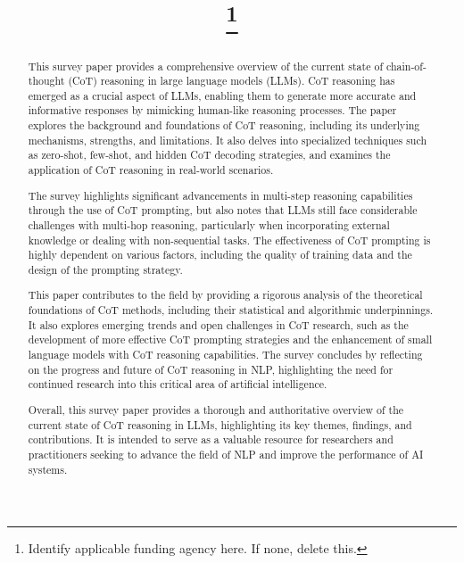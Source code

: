 \documentclass[conference]{IEEEtran}
\begin{document}
\title{
\thanks{Identify applicable funding agency here. If none, delete this.}
}

\author{
\and
{}
}

\maketitle

\begin{abstract}
This survey paper provides a comprehensive overview of the current state of chain-of-thought (CoT) reasoning in large language models (LLMs). CoT reasoning has emerged as a crucial aspect of LLMs, enabling them to generate more accurate and informative responses by mimicking human-like reasoning processes. The paper explores the background and foundations of CoT reasoning, including its underlying mechanisms, strengths, and limitations. It also delves into specialized techniques such as zero-shot, few-shot, and hidden CoT decoding strategies, and examines the application of CoT reasoning in real-world scenarios.

The survey highlights significant advancements in multi-step reasoning capabilities through the use of CoT prompting, but also notes that LLMs still face considerable challenges with multi-hop reasoning, particularly when incorporating external knowledge or dealing with non-sequential tasks. The effectiveness of CoT prompting is highly dependent on various factors, including the quality of training data and the design of the prompting strategy.

This paper contributes to the field by providing a rigorous analysis of the theoretical foundations of CoT methods, including their statistical and algorithmic underpinnings. It also explores emerging trends and open challenges in CoT research, such as the development of more effective CoT prompting strategies and the enhancement of small language models with CoT reasoning capabilities. The survey concludes by reflecting on the progress and future of CoT reasoning in NLP, highlighting the need for continued research into this critical area of artificial intelligence.

Overall, this survey paper provides a thorough and authoritative overview of the current state of CoT reasoning in LLMs, highlighting its key themes, findings, and contributions. It is intended to serve as a valuable resource for researchers and practitioners seeking to advance the field of NLP and improve the performance of AI systems.
\end{abstract}
\end{document}
